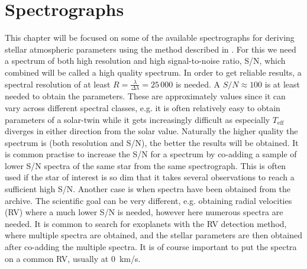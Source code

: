 \chapter{Spectrographs}
\label{cha:spectrographs}

This chapter will be focused on some of the available spectrographs for deriving
stellar atmospheric parameters using the method described in
. For this we need a spectrum of both high resolution and
high signal-to-noise ratio, S/N, which combined will be called a high quality
spectrum. In order to get reliable results, a spectral resolution of at least
$R=\frac{\lambda}{\Delta\lambda}=25\,000$ is needed. A $S/N\approx 100$ is at
least needed to obtain the parameters. These are approximately values since it
can vary across different spectral classes, e.g. it is often relatively easy to
obtain parameters of a solar-twin while it gets increasingly difficult as
especially $T_\mathrm{eff}$ diverges in either direction from the solar value.
Naturally the higher quality the spectrum is (both resolution and S/N), the
better the results will be obtained. It is common practise to increase the S/N
for a spectrum by co-adding a sample of lower S/N spectra of the same star from
the same spectrograph. This is often used if the star of interest is so dim that
it takes several observations to reach a sufficient high S/N. Another case is
when spectra have been obtained from the archive. The scientific goal can be
very different, e.g. obtaining radial velocities (RV) where a much lower S/N is
needed, however here numerous spectra are needed. It is common to search for
exoplanets with the RV detection method, where multiple spectra are obtained,
and the stellar parameters are then obtained after co-adding the multiple
spectra. It is of course important to put the spectra on a common RV, usually at
\SI{0}{km/s}.
